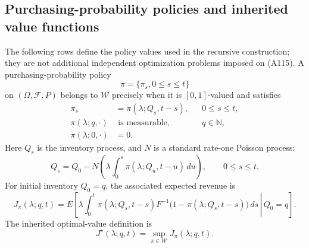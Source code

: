 \documentclass{article}
\begin{document}
\subsection*{Purchasing-probability policies and inherited value functions}
The following rows define the policy values used in the recursive construction; they are not additional independent optimization problems imposed on (A115). A purchasing-probability policy
\[
\pi=\{\pi_s,0\leq s\leq t\}
\]
on $(\Omega,\mathcal F,P)$ belongs to $\mathcal W$ precisely when it is $[0,1]$-valued and satisfies
\[
\begin{aligned}
\pi_s&=\pi(\lambda;Q_s,t-s),&&0\leq s\leq t,\\
\pi(\lambda;q,\cdot)&\text{ is measurable},&&q\in\mathbb N,\\
\pi(\lambda;0,\cdot)&=0.
\end{aligned}
\]
Here $Q_s$ is the inventory process, and $N$ is a standard rate-one Poisson process:
\begin{equation}
Q_s=Q_0-N\left(\lambda\int_0^s\pi(\lambda;Q_u,t-u)\,du\right),
\qquad 0\leq s\leq t.
\tag{A108}
\end{equation}
For initial inventory $Q_0=q$, the associated expected revenue is
\begin{equation}
J_\pi(\lambda;q,t)
=E\left[\left.
\lambda\int_0^t\pi(\lambda;Q_s,t-s)
F^{-1}\bigl(1-\pi(\lambda;Q_s,t-s)\bigr)\,ds
\,\right|\,Q_0=q\right].
\tag{A107}
\end{equation}
The inherited optimal-value definition is
\begin{equation}
J^\star(\lambda;q,t)=\sup_{\pi\in\mathcal W}J_\pi(\lambda;q,t).
\tag{A109}
\end{equation}
\end{document}

